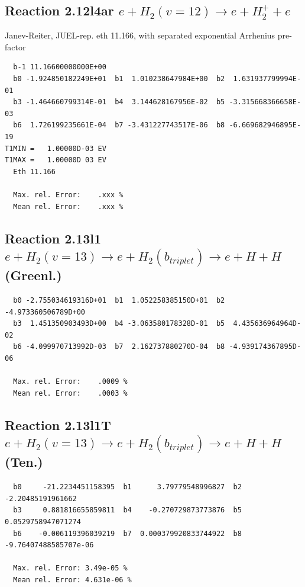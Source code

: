 \documentclass[12pt,dvipdfmx]{article}
\begin{document}
\subsection{
Reaction 2.12l4ar
 $ e + H_2(v=12) \rightarrow e + H_2^+  + e$
}
Janev-Reiter, JUEL-rep. eth 11.166,
with separated exponential Arrhenius pre-factor

\begin{small}\begin{verbatim}
  b-1 11.16600000000E+00
  b0 -1.924850182249E+01  b1  1.010238647984E+00  b2  1.631937799994E-01
  b3 -1.464660799314E-01  b4  3.144628167956E-02  b5 -3.315668366658E-03
  b6  1.726199235661E-04  b7 -3.431227743517E-06  b8 -6.669682946895E-19
T1MIN =   1.00000D-03 EV
T1MAX =   1.00000D 03 EV
  Eth 11.166

  Max. rel. Error:    .xxx %
  Mean rel. Error:    .xxx %
\end{verbatim}\end{small}

\newpage
\subsection{
Reaction 2.13l1
$ e + H_2(v=13) \rightarrow e + H_2(b_{triplet})\rightarrow e + H + H $ (Greenl.)
}


\begin{small}\begin{verbatim}
  b0 -2.755034619316D+01  b1  1.052258385150D+01  b2 -4.973360506789D+00
  b3  1.451350903493D+00  b4 -3.063580178328D-01  b5  4.435636964964D-02
  b6 -4.099970713992D-03  b7  2.162737880270D-04  b8 -4.939174367895D-06

  Max. rel. Error:    .0009 %
  Mean rel. Error:    .0003 %
\end{verbatim}\end{small}


\subsection{
Reaction 2.13l1T
$ e +  H_2(v=13) \rightarrow e + H_2(b_{triplet})\rightarrow e + H + H $ (Ten.)
}


\begin{small}\begin{verbatim}
  b0     -21.2234451158395  b1      3.79779548996827  b2     -2.20485191961662
  b3     0.881816655859811  b4    -0.270729873773876  b5    0.0529758947071274
  b6    -0.006119396039219  b7  0.000379920833744922  b8 -9.76407488585707e-06

  Max. rel. Error: 3.49e-05 %
  Mean rel. Error: 4.631e-06 %
\end{verbatim}\end{small}
\end{document}
